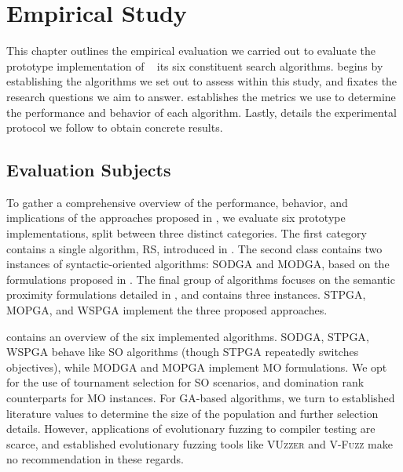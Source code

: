 \chapter{\label{cha:study}Empirical Study}

This chapter outlines the empirical evaluation we carried out
to evaluate the prototype implementation of \kf~ its six
constituent search algorithms.
 begins by establishing the algorithms
we set out to assess within this study, and  fixates the research
questions we aim to answer.
 establishes the metrics we use to determine the
performance and behavior of each algorithm.
Lastly,  details the experimental protocol
we follow to obtain concrete results.

\section{\label{sec:subjects}Evaluation Subjects}


To gather a comprehensive overview of the performance, behavior,
and implications of the approaches proposed in ,
we evaluate six prototype implementations, split between three distinct categories.
The first category contains a single algorithm, \gls{RS},
introduced in .
The second class contains two instances of syntactic-oriented
algorithms: \gls{SODGA} and \gls{MODGA}, based on the formulations
proposed in .
The final group of algorithms focuses on the semantic proximity
formulations detailed in , and contains three instances.
\gls{STPGA}, \gls{MOPGA}, and \gls{WSPGA}
implement the three proposed approaches.

 contains an overview of the six implemented algorithms.
\gls{SODGA}, \gls{STPGA}, \gls{WSPGA} behave like \gls{SO} algorithms
(though \gls{STPGA} repeatedly switches objectives),
while \gls{MODGA} and \gls{MOPGA} implement \gls{MO} formulations.
We opt for the use of tournament selection for \gls{SO} scenarios, and
domination rank counterparts for \gls{MO} instances.
For \gls{GA}-based algorithms, we turn to established literature values
to determine the size of the population and further selection details.
However, applications of evolutionary fuzzing to
compiler testing are scarce, and established evolutionary fuzzing
tools like \textsc{VUzzer} \cite{rawat2017vuzzer} and
\textsc{V-Fuzz} \cite{li2019v} make no recommendation in these regards.

